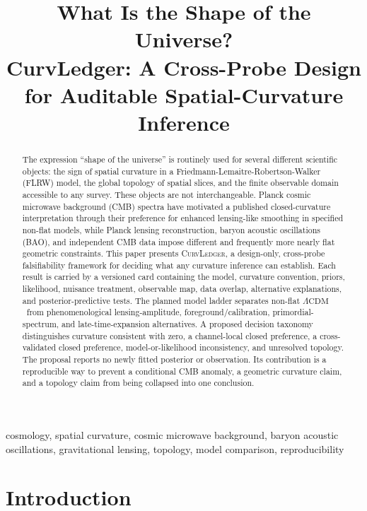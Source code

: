 \documentclass[conference]{IEEEtran}
\title{What Is the Shape of the Universe?\\
\large CurvLedger: A Cross-Probe Design for Auditable Spatial-Curvature Inference}
\author{\IEEEauthorblockN{Anonymous Research Proposal}}
\newcommand{\lcdm}{\ensuremath{\Lambda\mathrm{CDM}}}
\newcommand{\curvledger}{\textsc{CurvLedger}}
\begin{document}
\maketitle

\begin{abstract}
The expression ``shape of the universe'' is routinely used for several different scientific objects: the sign of spatial curvature in a Friedmann-Lemaitre-Robertson-Walker (FLRW) model, the global topology of spatial slices, and the finite observable domain accessible to any survey. These objects are not interchangeable. Planck cosmic microwave background (CMB) spectra have motivated a published closed-curvature interpretation through their preference for enhanced lensing-like smoothing in specified non-flat models, while Planck lensing reconstruction, baryon acoustic oscillations (BAO), and independent CMB data impose different and frequently more nearly flat geometric constraints. This paper presents \curvledger, a design-only, cross-probe falsifiability framework for deciding what any curvature inference can establish. Each result is carried by a versioned card containing the model, curvature convention, priors, likelihood, nuisance treatment, observable map, data overlap, alternative explanations, and posterior-predictive tests. The planned model ladder separates non-flat \lcdm\ from phenomenological lensing-amplitude, foreground/calibration, primordial-spectrum, and late-time-expansion alternatives. A proposed decision taxonomy distinguishes curvature consistent with zero, a channel-local closed preference, a cross-validated closed preference, model-or-likelihood inconsistency, and unresolved topology. The proposal reports no newly fitted posterior or observation. Its contribution is a reproducible way to prevent a conditional CMB anomaly, a geometric curvature claim, and a topology claim from being collapsed into one conclusion.
\end{abstract}

\begin{IEEEkeywords}
cosmology, spatial curvature, cosmic microwave background, baryon acoustic oscillations, gravitational lensing, topology, model comparison, reproducibility
\end{IEEEkeywords}

\section{Introduction}
\end{document}
